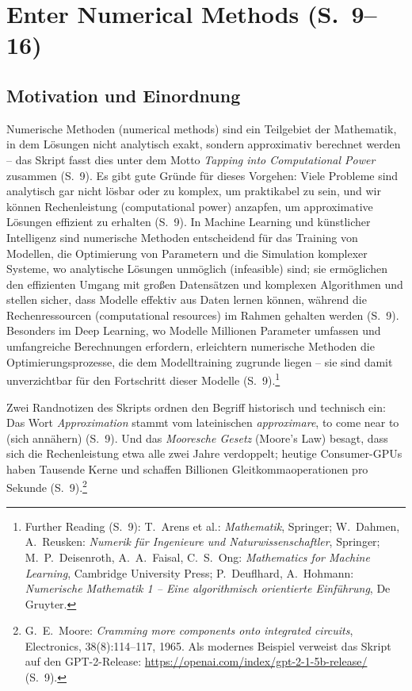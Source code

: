 \section{Enter Numerical Methods (S.~9--16)}

\subsection{Motivation und Einordnung}

Numerische Methoden (numerical methods) sind ein Teilgebiet der Mathematik, in dem Lösungen nicht analytisch exakt, sondern approximativ berechnet werden -- das Skript fasst dies unter dem Motto \emph{Tapping into Computational Power} zusammen (S.~9). Es gibt gute Gründe für dieses Vorgehen: Viele Probleme sind analytisch gar nicht lösbar oder zu komplex, um praktikabel zu sein, und wir können Rechenleistung (computational power) anzapfen, um approximative Lösungen effizient zu erhalten (S.~9). In Machine Learning und künstlicher Intelligenz sind numerische Methoden entscheidend für das Training von Modellen, die Optimierung von Parametern und die Simulation komplexer Systeme, wo analytische Lösungen unmöglich (infeasible) sind; sie ermöglichen den effizienten Umgang mit großen Datensätzen und komplexen Algorithmen und stellen sicher, dass Modelle effektiv aus Daten lernen können, während die Rechenressourcen (computational resources) im Rahmen gehalten werden (S.~9). Besonders im Deep Learning, wo Modelle Millionen Parameter umfassen und umfangreiche Berechnungen erfordern, erleichtern numerische Methoden die Optimierungsprozesse, die dem Modelltraining zugrunde liegen -- sie sind damit unverzichtbar für den Fortschritt dieser Modelle (S.~9).\footnote{Further Reading (S.~9): T.~Arens et al.: \emph{Mathematik}, Springer; W.~Dahmen, A.~Reusken: \emph{Numerik für Ingenieure und Naturwissenschaftler}, Springer; M.~P.~Deisenroth, A.~A.~Faisal, C.~S.~Ong: \emph{Mathematics for Machine Learning}, Cambridge University Press; P.~Deuflhard, A.~Hohmann: \emph{Numerische Mathematik 1 -- Eine algorithmisch orientierte Einführung}, De Gruyter.}

Zwei Randnotizen des Skripts ordnen den Begriff historisch und technisch ein: Das Wort \emph{Approximation} stammt vom lateinischen \emph{approximare}, \glqq to come near to\grqq{} (sich annähern) (S.~9). Und das \emph{Mooresche Gesetz} (Moore's Law) besagt, dass sich die Rechenleistung etwa alle zwei Jahre verdoppelt; heutige Consumer-GPUs haben Tausende Kerne und schaffen Billionen Gleitkommaoperationen pro Sekunde (S.~9).\footnote{G.~E.~Moore: \emph{Cramming more components onto integrated circuits}, Electronics, 38(8):114--117, 1965. Als modernes Beispiel verweist das Skript auf den GPT-2-Release: \url{https://openai.com/index/gpt-2-1-5b-release/} (S.~9).}

